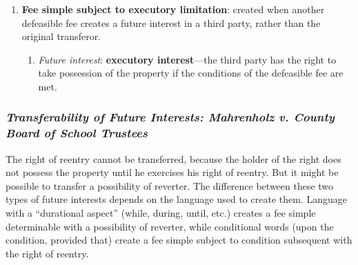 \begin{enumerate}
\begin{enumerate}
{        short} or divested at the transferor's election when a stated 
        condition happens.''\footnote{Casebook p. 224.} It is created by 
        conditional language---``but if,'' ``provided,'' ''on condition 
        that.'' 
        \begin{enumerate}
            \item \emph{Future interest}: \textbf{Right of entry} (or power of 
            termination)---O can exercise his right to reclaim possession of 
            the property, but there will not be an automatic conveyance.
        \end{enumerate}
        \item \textbf{Fee simple subject to executory limitation}: created 
        when another defeasible fee creates a future interest in a third 
        party, rather than the original transferor.
        \begin{enumerate}
            \item \emph{Future interest}: \textbf{executory interest}---the 
            third party has the right to take possession of the property if 
            the conditions of the defeasible fee are met.
        \end{enumerate}
    \end{enumerate}
\end{enumerate}

\subsubsection{\emph{Transferability of Future Interests: Mahrenholz v. County 
Board of School Trustees}}

The right of reentry cannot be transferred, because the holder of the right 
does not possess the property until he exercises his right of reentry. But it 
might be possible to transfer a possibility of reverter. The difference 
between these two types of future interests depends on the language used to 
create them. Language with a ``durational aspect'' (while, during, until, 
etc.) creates a fee simple determinable with a possibility of reverter, while 
conditional words (upon the condition, provided that) create a fee simple 
subject to condition subsequent with the right of reentry.

